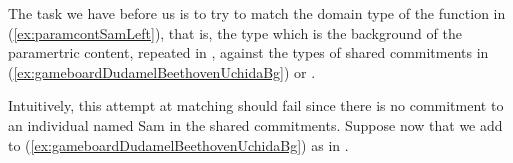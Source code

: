 The task we have before us is to try to match the domain type of the function
in (\ref{ex:paramcontSamLeft}), that is, the type which is the
background of the paramertric content, repeated in \nexteg{}, against the types of shared commitments
in (\ref{ex:gameboardDudamelBeethovenUchidaBg}) or \preveg{}.
\begin{ex} 
\label{ex:namedSam} 
\end{ex} 
Intuitively, this attempt at matching should fail since there is no
commitment to an individual named Sam in the shared commitments.
Suppose now that we add to
(\ref{ex:gameboardDudamelBeethovenUchidaBg}) as in \nexteg{}.
\begin{ex} 
\label{ex:sharedcommsnonexpanded}
\end{ex} 
